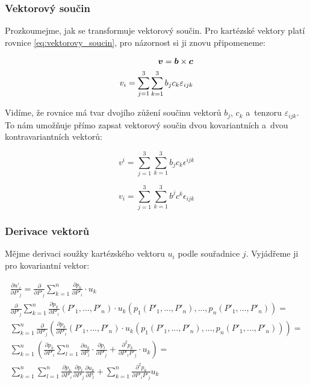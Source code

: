 \subsubsection{Vektorový součin}

Prozkoumejme, jak se transformuje vektorový součin. Pro kartézské vektory platí rovnice \eqref{eq:vektorovy_soucin}, pro názornost si ji znovu připomeneme:

\begin{equation}
\begin{split}
\boldsymbol{v} = \boldsymbol{b} \times \boldsymbol{c} \\
v_i = \sum_{j=1}^3 \sum_{k=1}^3 b_j c_k \varepsilon_{ijk}
\end{split}
\end{equation}

Vidíme, že rovnice má tvar dvojího zůžení součinu vektorů \(b_j\), \(c_k\) a~tenzoru \(\varepsilon_{ijk}\). To nám umožňuje přímo zapsat vektorový součin dvou kovariantních a~dvou kontravariantních vektorů:

\begin{equation}
v^i = \sum_{j=1}^3 \sum_{k=1}^3 b_j c_k \epsilon^{ijk}
\end{equation}

\begin{equation}
v_i = \sum_{j=1}^3 \sum_{k=1}^3 b^j c^k \epsilon_{ijk}
\end{equation}

\subsubsection{Derivace vektorů}

Mějme derivaci soužky kartézského vektoru \(u_i\) podle souřadnice \(j\). Vyjádřeme ji pro kovariantní vektor:

\begin{equation}
\label{eq:derivace_vektoru}
\begin{split}
\frac{\partial u'_i}{\partial P'_j} = \frac{\partial}{\partial P'_j} \sum_{k=1}^n \frac{\partial p_k}{\partial P'_i} \cdot u_k \\
\frac{\partial}{\partial P'_j} \sum_{k=1}^n \frac{\partial p_k}{\partial P'_i}(P'_1, ..., P'_n) \cdot u_k(p_1(P'_1, ..., P'_n), ..., p_n(P'_1, ..., P'_n)) = \\
\sum_{k=1}^n \frac{\partial}{\partial P'_j} \left( \frac{\partial p_k}{\partial P'_i}(P'_1, ..., P'_n) \cdot u_k(p_1(P'_1, ..., P'_n), ..., p_n(P'_1, ..., P'_n)) \right) = \\
\sum_{k=1}^n \left(\frac{\partial p_k}{\partial P'_i} \sum_{l=1}^n \frac{\partial u_k}{\partial P_l} \cdot \frac{\partial p_l}{\partial P'_j} + \frac{\partial^2 p_k}{\partial P'_i P'_j} \cdot u_k \right) = \\
\sum_{k=1}^n \sum_{l=1}^n \frac{\partial p_k}{\partial P'_i} \frac{\partial p_l}{\partial P'_j} \frac{\partial u_k}{\partial P_l} + \sum_{k=1}^n \frac{\partial^2 p_k}{\partial P'_i P'_j} u_k
\end{split} 
\end{equation}

